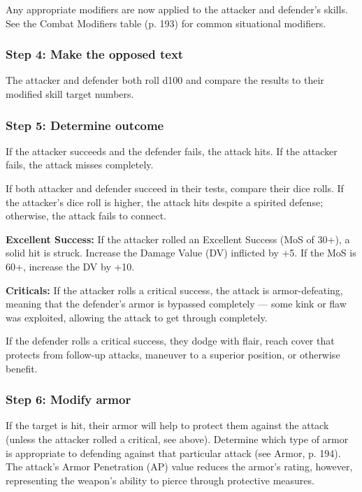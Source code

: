 Any appropriate modifiers are now applied to the attacker and defender’s skills. See the Combat Modifiers table (p. 193) for common situational modifiers.

\subsubsection{Step 4: Make the opposed text}

The attacker and defender both roll d100 and compare the results to their modified skill target numbers.

\subsubsection{Step 5: Determine outcome}

If the attacker succeeds and the defender fails, the attack hits. If the attacker fails, the attack misses completely.

If both attacker and defender succeed in their tests, compare their dice rolls. If the attacker’s dice roll is higher, the attack hits despite a spirited defense; otherwise, the attack fails to connect.

\textbf{Excellent Success:} If the attacker rolled an Excellent Success (MoS of 30+), a solid hit is struck. Increase the Damage Value (DV) inflicted by +5. If the MoS is 60+, increase the DV by +10.

\textbf{Criticals:} If the attacker rolls a critical success, the attack is armor-defeating, meaning that the defender’s armor is bypassed completely --- some kink or flaw was exploited, allowing the attack to get through completely.

If the defender rolls a critical success, they dodge with flair, reach cover that protects from follow-up attacks, maneuver to a superior position, or otherwise benefit.

\subsubsection{Step 6: Modify armor}

If the target is hit, their armor will help to protect them against the attack (unless the attacker rolled a critical, see above). Determine which type of armor is appropriate to defending against that particular attack (see Armor, p. 194). The attack’s Armor Penetration (AP) value reduces the armor’s rating, however, representing the weapon’s ability to pierce through protective measures.

